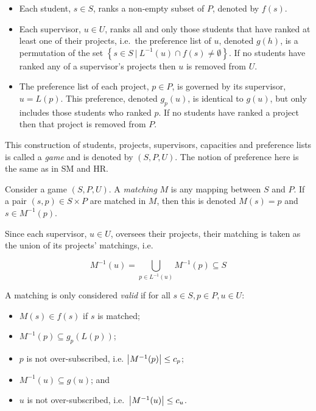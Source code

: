 \begin{definition}
    \begin{itemize}
        \item Each student, \(s \in S\), ranks a non-empty subset of \(P\),
            denoted by \(f(s)\).
        \item Each supervisor, \(u \in U\), ranks all and only those students
            that have ranked at least one of their projects, i.e.\ the
            preference list of \(u\), denoted \(g(h)\), is a permutation of the
            set
            \(\left\{s \in S \ | \ L^{-1}(u) \cap f(s) \neq \emptyset\right\}\).
            If no students have ranked any of a supervisor's projects then \(u\)
            is removed from \(U\).
        \item The preference list of each project, \(p \in P\), is governed by
            its supervisor, \(u = L(p)\). This preference, denoted \(g_p (u)\),
            is identical to \(g(u)\), but only includes those students who
            ranked \(p\). If no students have ranked a project then that project
            is removed from \(P\).
    \end{itemize}

    This construction of students, projects, supervisors, capacities and
    preference lists is called a \emph{game} and is denoted by \((S, P, U)\).
    The notion of preference here is the same as in SM and HR.
\end{definition}

\begin{definition}\label{def:sa_matching}
    Consider a game \((S, P, U)\). A \emph{matching} \(M\) is any mapping
    between \(S\) and \(P\). If a pair \((s, p) \in S \times P\) are matched in
    \(M\), then this is denoted \(M(s) = p\) and \(s \in M^{-1}(p)\).

    Since each supervisor, \(u \in U\), oversees their projects, their matching
    is taken as the union of its projects' matchings, i.e.

    \begin{equation}
        M^{-1}(u) = \bigcup_{p \in L^{-1}(u)} M^{-1}(p) \subseteq S
    \end{equation}

    A matching is only considered \emph{valid} if for all \(s \in S, p \in P, u
    \in U\):

    \begin{itemize}
        \item \(M(s) \in f(s)\) if \(s\) is matched;
        \item \(M^{-1}(p) \subseteq g_p(L(p))\);
        \item \(p\) is not over-subscribed, i.e. \(\abs*{M^{-1}(p)} \le c_p\);
        \item \(M^{-1}(u) \subseteq g(u)\); and
        \item \(u\) is not over-subscribed, i.e.\ \(\abs*{M^{-1}(u)} \leq c_u\).
    \end{itemize}
\end{definition}

